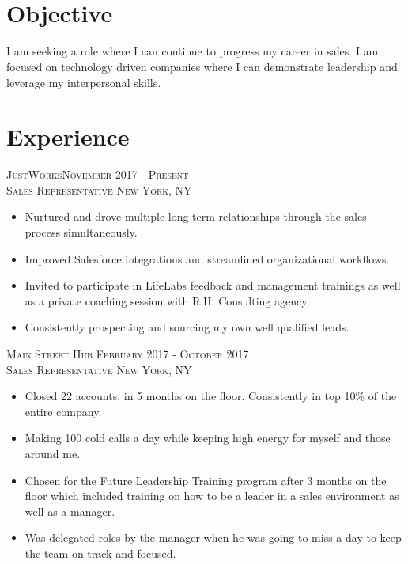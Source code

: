 \documentclass[oneside, final]{scrartcl}
\begin{document}
\begin{center}
 
\textsc{\LARGE{}}\\
\\



\section{Objective}
\begin{flushleft}
I am seeking a role where I can continue to progress my career in sales. I am focused on technology driven
companies where I can demonstrate leadership and leverage my interpersonal skills.
\end{flushleft}



\section{Experience}


\textsc{JustWorks\hfill November 2017 - Present \\}
\textsc{Sales Representative \hfill New York, NY\\}
\begin{itemize}
	\setlength{\itemsep}{1pt}
	\setlength{\parskip}{0pt}
	\setlength{\parsep}{0pt}
	\setlength{\leftmargin}{-5mm}
    \item Nurtured and drove multiple long-term relationships through the sales process simultaneously.
    \item Improved Salesforce integrations and streamlined organizational workflows.
    \item Invited to participate in LifeLabs feedback and management trainings as well as a private coaching session with R.H. Consulting agency.
    \item Consistently prospecting and sourcing my own well qualified leads.
    \end{itemize}


\textsc{Main Street Hub \hfill February 2017 - October 2017 \\}
\textsc{Sales Representative \hfill New York, NY\\}
\begin{itemize}
	\setlength{\itemsep}{1pt}
	\setlength{\parskip}{0pt}
	\setlength{\parsep}{0pt}
	\setlength{\leftmargin}{-5mm}
\item Closed 22 accounts, in 5 months on the floor. Consistently in top 10\% of the entire company.
\item Making 100 cold calls a day while keeping high energy for myself and those around me.
\item Chosen for the Future Leadership Training program after 3 months on the floor which included training on how to be a leader in a sales environment as well as a manager.
\item Was delegated roles by the manager when he was going to miss a day to keep the team on track and focused.
\end{itemize}





\end{center}
\end{document}
